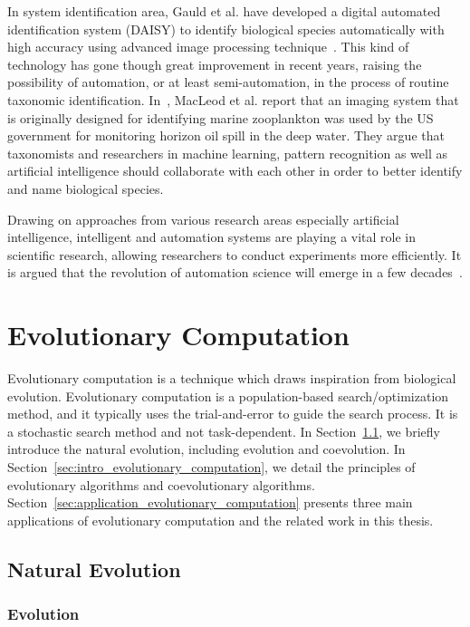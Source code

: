 In system identification area, Gauld et al. have developed a digital automated identification system (DAISY) to identify biological species automatically with high accuracy using advanced image processing technique~\cite{Gauld_2000}. This kind of technology has gone though great improvement in recent years, raising the possibility of automation, or at least semi-automation, in the process of routine taxonomic identification. In~\cite{MacLeod_2010}, MacLeod et al. report that an imaging system that is originally designed for identifying marine zooplankton was used by the US government for monitoring horizon oil spill in the deep water. They argue that taxonomists and researchers in machine learning, pattern recognition as well as artificial intelligence should collaborate with each other in order to better identify and name biological species. 

Drawing on approaches from various research areas especially artificial intelligence, intelligent and automation systems are playing a vital role in scientific research, allowing researchers to conduct experiments more efficiently. It is argued that the revolution of automation science will emerge in a few decades~\cite{King_2009}.

\section{Evolutionary Computation}\label{sec:evolutionary_computation}

Evolutionary computation is a technique which draws inspiration from biological evolution. Evolutionary computation is a population-based search/optimization method, and it typically uses the trial-and-error to guide the search process. It is a stochastic search method and not task-dependent. In Section~\ref{sec:natural_evolution}, we briefly introduce the natural evolution, including evolution and coevolution. In Section~\ref{sec:intro_evolutionary_computation}, we detail the principles of evolutionary algorithms and coevolutionary algorithms. Section~\ref{sec:application_evolutionary_computation} presents three main applications of evolutionary computation and the related work in this thesis.

\subsection{Natural Evolution}\label{sec:natural_evolution}

\subsubsection{Evolution}

